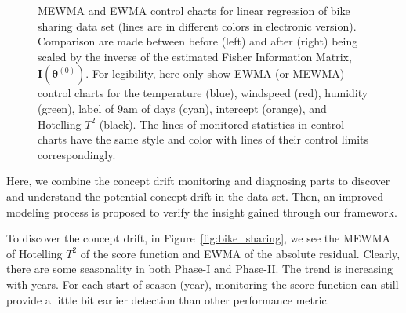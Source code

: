 \documentclass[twoside,11pt]{article}
\begin{document}
\begin{figure}[!htbp]
  \caption{
  MEWMA and EWMA control charts for linear regression of bike sharing data set (lines are in different colors in electronic version). Comparison are made between before (left) and after (right) being scaled by the inverse of the estimated Fisher Information Matrix, $\mathbf {I} ( {\bm{\theta}} ^{(0)})$. For legibility, here only show EWMA (or MEWMA) control charts for the temperature (blue), windspeed (red), humidity (green), label of $9$am of days (cyan), intercept (orange), and Hotelling $T^2$ (black). The lines of monitored statistics in control charts have the same style and color with lines of their control limits correspondingly.
}
\label{fig:bike_sharing_diag}
\end{figure}

Here, we combine the concept drift monitoring and diagnosing parts to discover and understand the potential concept drift in the data set. Then, an improved modeling process is proposed to verify the insight gained through our framework.

To discover the concept drift, in Figure~\ref{fig:bike_sharing}, we see the MEWMA of Hotelling $T^2$ of the score function and EWMA of the absolute residual. Clearly, there are some seasonality in both Phase-I and Phase-II. The trend is increasing with years. For each start of season (year), monitoring the score function can still provide a little bit earlier detection than other performance metric. 
\end{document}
